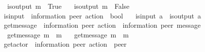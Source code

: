 \begin{isabellebody}
\ \ {\isachardoublequoteopen}is{\isacharunderscore}{\kern0pt}output\ {\isacharparenleft}{\kern0pt}{\isacharbang}{\kern0pt}{\isasymlangle}m{\isasymrangle}{\isacharparenright}{\kern0pt}\ {\isacharequal}{\kern0pt}\ True{\isachardoublequoteclose}\ {\isacharbar}{\kern0pt}\isanewline
\ \ {\isachardoublequoteopen}is{\isacharunderscore}{\kern0pt}output\ {\isacharparenleft}{\kern0pt}{\isacharquery}{\kern0pt}{\isasymlangle}m{\isasymrangle}{\isacharparenright}{\kern0pt}\ {\isacharequal}{\kern0pt}\ False{\isachardoublequoteclose}\isanewline
\isanewline
{}\isamarkupfalse%
\ is{\isacharunderscore}{\kern0pt}input\ {\isacharcolon}{\kern0pt}{\isacharcolon}{\kern0pt}\ {\isachardoublequoteopen}{\isacharparenleft}{\kern0pt}{\isacharprime}{\kern0pt}information{\isacharcomma}{\kern0pt}\ {\isacharprime}{\kern0pt}peer{\isacharparenright}{\kern0pt}\ action\ {\isasymRightarrow}\ bool{\isachardoublequoteclose}\ \isanewline
\ \ {\isachardoublequoteopen}is{\isacharunderscore}{\kern0pt}input\ a\ {\isasymequiv}\ {\isasymnot}{\isacharparenleft}{\kern0pt}is{\isacharunderscore}{\kern0pt}output\ a{\isacharparenright}{\kern0pt}{\isachardoublequoteclose}\isanewline
\isanewline
{}\isamarkupfalse%
\ get{\isacharunderscore}{\kern0pt}message\ {\isacharcolon}{\kern0pt}{\isacharcolon}{\kern0pt}\ {\isachardoublequoteopen}{\isacharparenleft}{\kern0pt}{\isacharprime}{\kern0pt}information{\isacharcomma}{\kern0pt}\ {\isacharprime}{\kern0pt}peer{\isacharparenright}{\kern0pt}\ action\ {\isasymRightarrow}\ {\isacharparenleft}{\kern0pt}{\isacharprime}{\kern0pt}information{\isacharcomma}{\kern0pt}\ {\isacharprime}{\kern0pt}peer{\isacharparenright}{\kern0pt}\ message{\isachardoublequoteclose}\ \isanewline
\ \ {\isachardoublequoteopen}get{\isacharunderscore}{\kern0pt}message\ {\isacharparenleft}{\kern0pt}{\isacharbang}{\kern0pt}{\isasymlangle}m{\isasymrangle}{\isacharparenright}{\kern0pt}\ {\isacharequal}{\kern0pt}\ m{\isachardoublequoteclose}\ {\isacharbar}{\kern0pt}\isanewline
\ \ {\isachardoublequoteopen}get{\isacharunderscore}{\kern0pt}message\ {\isacharparenleft}{\kern0pt}{\isacharquery}{\kern0pt}{\isasymlangle}m{\isasymrangle}{\isacharparenright}{\kern0pt}\ {\isacharequal}{\kern0pt}\ m{\isachardoublequoteclose}\isanewline
\isanewline
{}\isamarkupfalse%
\ get{\isacharunderscore}{\kern0pt}actor\ {\isacharcolon}{\kern0pt}{\isacharcolon}{\kern0pt}\ {\isachardoublequoteopen}{\isacharparenleft}{\kern0pt}{\isacharprime}{\kern0pt}information{\isacharcomma}{\kern0pt}\ {\isacharprime}{\kern0pt}peer{\isacharparenright}{\kern0pt}\ action\ {\isasymRightarrow}\ {\isacharprime}{\kern0pt}peer{\isachardoublequoteclose}\ \isanewline

\end{isabellebody}
